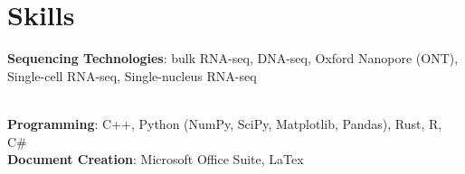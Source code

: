 \documentclass[A4,11pt]{article}
\makeatletter
\newcommand{\CVSubheading}[4]{
  \vspace{-2pt}\item
    \begin{tabular*}{0.97\textwidth}[t]{l@{\extracolsep{\fill}}r}
      \textbf{#1} & #2 \\
      \small#3 & \small #4 \\
    \end{tabular*}\vspace{-7pt}
}
\newcommand{\CVSubHeadingListStart}{\begin{itemize}[leftmargin=0.5cm, label={}]}
\newcommand{\CVSubHeadingListEnd}{\end{itemize}}
\makeatother
\begin{document}
\begin{comment}
This section is compressed from the various skills sections that Euro CV
recommends.
\end{comment}

\section{Skills}
 \begin{itemize}[leftmargin=0.5cm, label={}]
    \small{\item{
    \textbf{Sequencing Technologies}{: bulk RNA-seq, DNA-seq, Oxford Nanopore (ONT), Single-cell RNA-seq, Single-nucleus RNA-seq}
    }} \\
     \textbf{Programming}{: C++, Python (NumPy, SciPy, Matplotlib, Pandas), Rust, R, C\#} \\
     \textbf{Document Creation}{: Microsoft Office Suite, LaTex} \\
 \end{itemize}
    

\end{document}
